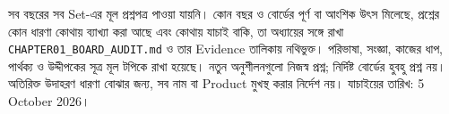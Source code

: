 সব বছরের সব Set-এর মূল প্রশ্নপত্র পাওয়া যায়নি। কোন বছর ও বোর্ডের পূর্ণ বা আংশিক উৎস মিলেছে, প্রশ্নের কোন ধারণা কোথায় ব্যাখ্যা করা আছে এবং কোথায় যাচাই বাকি, তা অধ্যায়ের সঙ্গে রাখা \texttt{CHAPTER01\_BOARD\_AUDIT.md} ও তার Evidence তালিকায় নথিভুক্ত।
পরিভাষা, সংজ্ঞা, কাজের ধাপ, পার্থক্য ও উদ্দীপকের সূত্র মূল টপিকে রাখা হয়েছে। নতুন অনুশীলনগুলো নিজস্ব প্রশ্ন; নির্দিষ্ট বোর্ডের হুবহু প্রশ্ন নয়। অতিরিক্ত উদাহরণ ধারণা বোঝার জন্য, সব নাম বা Product মুখস্থ করার নির্দেশ নয়। যাচাইয়ের তারিখ: 5 October 2026।


